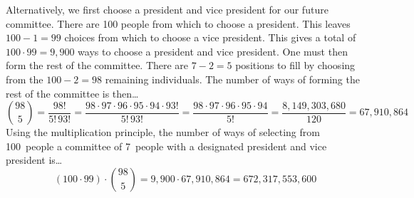 \documentclass[11pt,letterpaper]{article}
\begin{document}
Alternatively, we first choose a president and vice president for our future committee. There are 100 people from which to choose a president. This leaves $100 - 1= 99$ choices from which to choose a vice president. This gives a total of $100 \cdot 99= 9,\!900$ ways to choose a president and vice president. One must then form the rest of the committee. There are $7 - 2= 5$ positions to fill by choosing from the $100 - 2= 98$ remaining individuals. The number of ways of forming the rest of the committee is then\dots
	\[
	\binom{98}{5}= \dfrac{98!}{5! \, 93!}= \dfrac{98 \cdot 97 \cdot 96 \cdot 95 \cdot 94 \cdot 93!}{5! \, 93!}= \dfrac{98 \cdot 97 \cdot 96 \cdot 95 \cdot 94}{5!}= \dfrac{8,\!149,\!303,\!680}{120}= 67,\!910,\!864
	\]
Using the multiplication principle, the number of ways of selecting from 100~people a committee of 7~people with a designated president and vice president is\dots
	\[
	(100 \cdot 99) \cdot \binom{98}{5}= 9,\!900 \cdot 67,\!910,\!864= 672,\!317,\!553,\!600
	\] 
\end{document}
